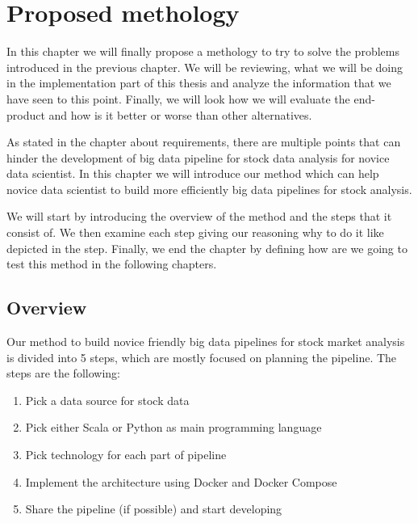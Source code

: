 \chapter{Proposed methology}
\label{chapter:methods}


In this chapter we will finally propose a methology to try to solve the problems introduced in the previous chapter.
We will be reviewing, what we will be doing in the implementation part of this thesis and analyze the information that we have seen to this point.
Finally, we will look how we will evaluate the end-product and how is it better or worse than other alternatives.

As stated in the chapter about requirements, there are multiple points that can hinder the development of big data pipeline for stock data analysis for novice data scientist.
In this chapter we will introduce our method which can help novice data scientist to build more efficiently big data pipelines for stock analysis.

We will start by introducing the overview of the method and the steps that it consist of.
We then examine each step giving our reasoning why to do it like depicted in the step.
Finally, we end the chapter by defining how are we going to test this method in the following chapters.

\section{Overview}

Our method to build novice friendly big data pipelines for stock market analysis is divided into 5 steps, which are mostly focused on planning the pipeline.
The steps are the following:

\begin{enumerate}
    \item Pick a data source for stock data
    \item Pick either Scala or Python as main programming language
    \item Pick technology for each part of pipeline
    \item Implement the architecture using Docker and Docker Compose
    \item Share the pipeline (if possible) and start developing
\end{enumerate}

